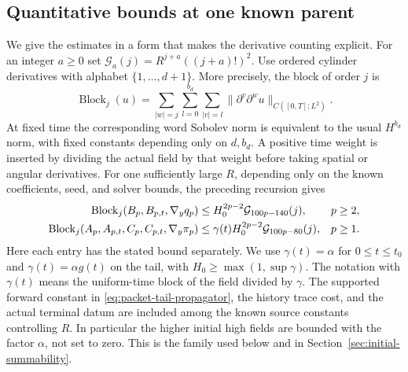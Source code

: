 \subsection{Quantitative bounds at one known parent}
We give the estimates in a form that makes the derivative counting
explicit. For an integer $a\ge0$ set
$\mathcal G_a(j)=R^{j+a}((j+a)!)^2$.
Use ordered cylinder derivatives with alphabet $\{1,\ldots,d+1\}$.
More precisely, the block of order $j$ is
\[
 \operatorname{Block}_j(u)=
 \sum_{|w|=j}\sum_{l=0}^{b_d}\sum_{|v|=l}
     \|\partial^v\partial^w u\|_{C([0,T];L^2)}.
\]
At fixed time the corresponding word Sobolev norm is equivalent to the
usual $H^{b_d}$ norm, with fixed constants depending only on $d,b_d$.
A positive time weight is inserted by dividing the actual field by that
weight before taking spatial or angular derivatives. For one sufficiently
large $R$, depending only on the known coefficients, seed, and solver
bounds, the preceding recursion gives
\begin{align}
 \operatorname{Block}_j(B_p,B_{p,t},\nabla_yq_p)
   &\le H_0^{2p-2}\mathcal G_{100p-140}(j),&&p\ge2,\notag\\
 \operatorname{Block}_j(A_p,A_{p,t},C_p,C_{p,t},\nabla_y\pi_p)
   &\le \gamma(t)H_0^{2p-2}\mathcal G_{100p-80}(j),&&p\ge1.
                                                        \label{eq:packet-grade-bounds}
\end{align}
Here each entry has the stated bound separately. We use
$\gamma(t)=\alpha$ for $0\le t\le t_0$ and
$\gamma(t)=\alpha g(t)$ on the tail, with
$H_0\ge\max(1,\sup\gamma)$. The notation with $\gamma(t)$ means the
uniform-time block of the field divided by $\gamma$. The supported
forward constant in \eqref{eq:packet-tail-propagator}, the history trace
cost, and the actual terminal datum are included among the known source
constants controlling $R$. In particular the higher initial high fields
are bounded with the factor $\alpha$, not set to zero. This is the
family used below and in Section~\ref{sec:initial-summability}.

